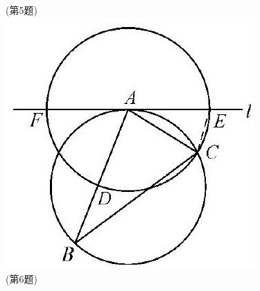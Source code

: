 \documentclass[10pt]{article}
\begin{document}
(第5题)\\
\includegraphics[max width=\textwidth, center]{2024_10_30_66b8e5e701da2093c133g-078(3)}\\
(第6题)
\end{document}
